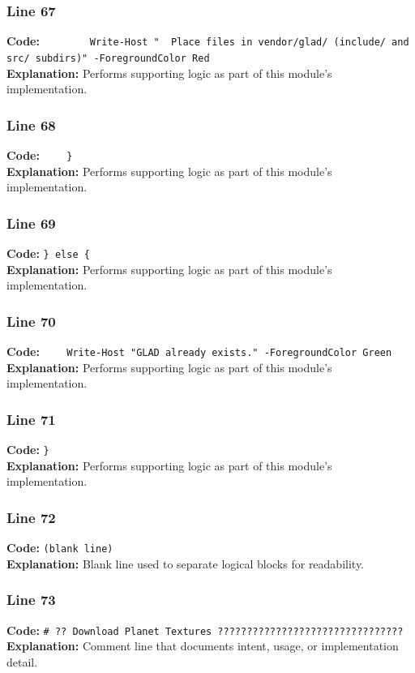 \documentclass[11pt,a4paper]{article}
\begin{document}
\subsubsection*{Line 67}
\textbf{Code:} \verb|        Write-Host "  Place files in vendor/glad/ (include/ and src/ subdirs)" -ForegroundColor Red|\\
\textbf{Explanation:} Performs supporting logic as part of this module's implementation.

\subsubsection*{Line 68}
\textbf{Code:} \verb|    }|\\
\textbf{Explanation:} Performs supporting logic as part of this module's implementation.

\subsubsection*{Line 69}
\textbf{Code:} \verb|} else {|\\
\textbf{Explanation:} Performs supporting logic as part of this module's implementation.

\subsubsection*{Line 70}
\textbf{Code:} \verb|    Write-Host "GLAD already exists." -ForegroundColor Green|\\
\textbf{Explanation:} Performs supporting logic as part of this module's implementation.

\subsubsection*{Line 71}
\textbf{Code:} \verb|}|\\
\textbf{Explanation:} Performs supporting logic as part of this module's implementation.

\subsubsection*{Line 72}
\textbf{Code:} \texttt{(blank line)}\\
\textbf{Explanation:} Blank line used to separate logical blocks for readability.

\subsubsection*{Line 73}
\textbf{Code:} \verb|# ?? Download Planet Textures ????????????????????????????????|\\
\textbf{Explanation:} Comment line that documents intent, usage, or implementation detail.
\end{document}
